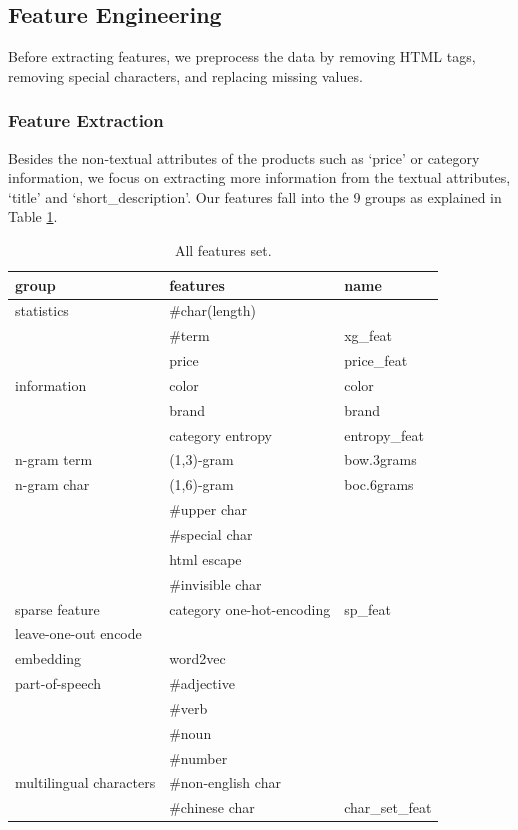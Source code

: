 \documentclass[sigconf]{acmart}
\begin{document}
\subsection{Feature Engineering}
Before extracting features, we preprocess the data by removing HTML tags, removing special characters, and replacing missing values.
\subsubsection{Feature Extraction}
Besides the non-textual attributes of the products such as `price' or category information, we focus on extracting more information from the textual attributes, `title' and `short\_description'. Our features fall into the 9 groups as explained in Table \ref{tbl:features}.
\begin{table}[]
\small
\centering
\caption{All features set.}
\label{tbl:features}
\begin{tabular}{lll}
\hline
\textbf{group} & \textbf{features} & \textbf{name} \\ \hline
statistics&\#char(length)\\&\#term & xg\_feat \\& price & price\_feat \\ %
information&color & color\\&brand&brand\\&category entropy & entropy\_feat\\ %
n-gram term& (1,3)-gram & bow.3grams \\
n-gram char&(1,6)-gram & boc.6grams\\&\#upper char\\&\#special char\\&html escape\\&\#invisible char\\ %
sparse feature &  category one-hot-encoding & sp\_feat\\
leave-one-out encode & \\
embedding&word2vec\cite{DBLP:conf/nips/MikolovSCCD13}\\
part-of-speech&\#adjective\\&\#verb\\&\#noun\\&\#number\\ %
multilingual characters&\#non-english char\\&\#chinese char & char\_set\_feat \\ %

\end{tabular}
\end{table}
\end{document}
